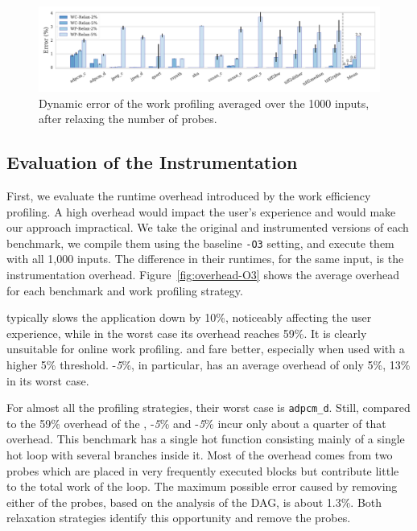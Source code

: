 \begin{figure}[t!]
    \centering
    \includegraphics[width=\textwidth]{figs/error-O3.pdf}
    \caption{Dynamic error of the work profiling averaged over the 1000 inputs, after relaxing the number of probes.}
    \vspace{-3mm}
    \label{fig:error-O3}
\end{figure}

\subsection{Evaluation of the Instrumentation}

First, we evaluate the runtime overhead introduced by the work efficiency profiling. A high overhead would impact the user's experience
and would make our approach impractical. We take the original and instrumented versions of each benchmark, we compile them using the
baseline \texttt{-O3} setting, and execute them with all 1,000 inputs. The difference in their runtimes, for the same input, is the
instrumentation overhead. Figure~\ref{fig:overhead-O3} shows the average overhead for each benchmark and work profiling strategy.

\OptProf typically slows the application down by 10\%, noticeably affecting the user experience, while in the worst case its overhead
reaches 59\%. It is clearly unsuitable for online work profiling. \WCRelax and \WPRelax fare better, especially when used with a higher
5\% threshold. \WPRelax-\textit{5}\%, in particular, has an average overhead of only 5\%, 13\% in its worst case.

For almost all the profiling strategies, their worst case is \texttt{adpcm\_d}. Still, compared to the 59\% overhead of the \OptProf,
\WCRelax-\textit{5}\% and \WPRelax-\textit{5}\% incur only about a quarter of that overhead. This benchmark has a single hot function
consisting mainly of a single hot loop with several branches inside it. Most of the overhead comes from two probes which are placed in
very frequently executed blocks but contribute little to the total work of the loop. The maximum possible error caused by removing either
of the probes, based on the analysis of the DAG, is about 1.3\%. Both relaxation strategies identify this opportunity and remove the probes.

